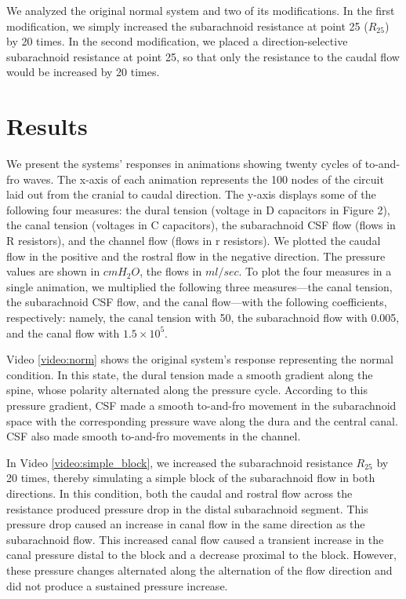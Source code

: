 \documentclass[fleqn,10pt]{wlscirep}
\begin{document}
We analyzed the original normal system and two of its modifications. In the
first modification, we simply increased the subarachnoid resistance at
point 25 ($R_{25}$) by 20 times. In the second modification, we placed a
direction-selective subarachnoid resistance at point 25, so that only the
resistance to the caudal flow would be increased by 20 times.

\section*{Results}

We present the systems' responses in animations showing twenty cycles of
to-and-fro waves. The x-axis of each animation represents the 100 nodes of
the circuit laid out from the cranial to caudal direction. The y-axis
displays some of the following four measures: the dural tension (voltage in
D capacitors in Figure 2), the canal tension (voltages in C capacitors),
the subarachnoid CSF flow (flows in R resistors), and the channel flow
(flows in r resistors). We plotted the caudal flow in the positive and the
rostral flow in the negative direction. The pressure values are shown in
$cmH_2O$, the flows in $ml/sec$. To plot the four measures in a single
animation, we multiplied the following three measures---the canal tension,
the subarachnoid CSF flow, and the canal flow---with the following
coefficients, respectively: namely, the canal tension with 50, the
subarachnoid flow with 0.005, and the canal flow with $1.5\times10^{5}$. 

Video \ref{video:norm} shows the original system's response representing
the normal condition. In this state, the dural tension made a smooth
gradient along the spine, whose polarity alternated along the pressure
cycle. According to this pressure gradient, CSF made a smooth to-and-fro movement
in the subarachnoid space with the corresponding pressure wave along the
dura and the central canal. CSF also made smooth to-and-fro movements in
the channel.


In Video \ref{video:simple_block}, we increased the subarachnoid resistance
$R_{25}$ by 20 times, thereby simulating a simple block of the subarachnoid
flow in both directions. In this condition, both the caudal and rostral
flow across the resistance produced pressure drop in the distal
subarachnoid segment.  This pressure drop caused an increase in canal flow
in the same direction as the subarachnoid flow. This increased canal flow
caused a transient increase in the canal pressure distal to the block and a
decrease proximal to the block. However, these pressure changes alternated
along the alternation of the flow direction and did not produce a sustained
pressure increase.
\end{document}
